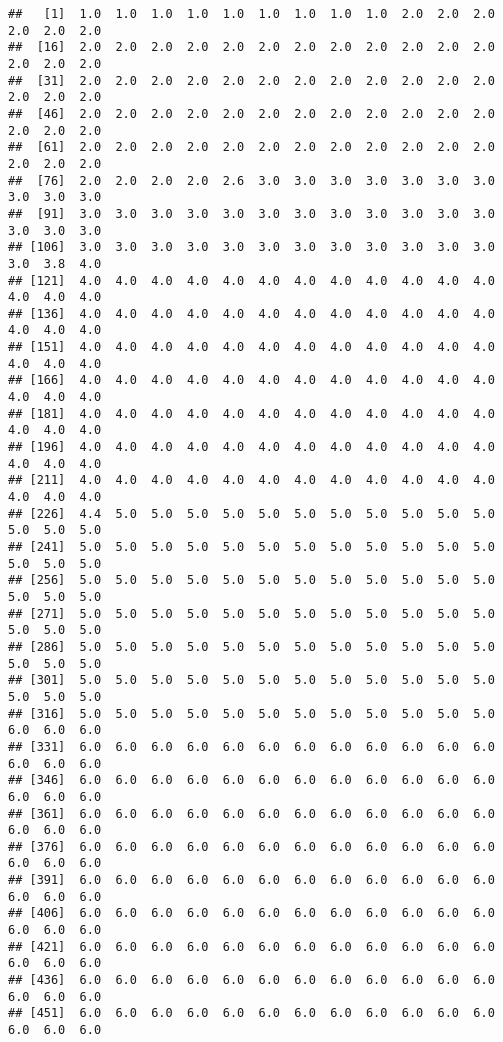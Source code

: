 \documentclass[
]{article}
\begin{document}
\begin{verbatim}
##   [1]  1.0  1.0  1.0  1.0  1.0  1.0  1.0  1.0  1.0  2.0  2.0  2.0  2.0  2.0  2.0
##  [16]  2.0  2.0  2.0  2.0  2.0  2.0  2.0  2.0  2.0  2.0  2.0  2.0  2.0  2.0  2.0
##  [31]  2.0  2.0  2.0  2.0  2.0  2.0  2.0  2.0  2.0  2.0  2.0  2.0  2.0  2.0  2.0
##  [46]  2.0  2.0  2.0  2.0  2.0  2.0  2.0  2.0  2.0  2.0  2.0  2.0  2.0  2.0  2.0
##  [61]  2.0  2.0  2.0  2.0  2.0  2.0  2.0  2.0  2.0  2.0  2.0  2.0  2.0  2.0  2.0
##  [76]  2.0  2.0  2.0  2.0  2.6  3.0  3.0  3.0  3.0  3.0  3.0  3.0  3.0  3.0  3.0
##  [91]  3.0  3.0  3.0  3.0  3.0  3.0  3.0  3.0  3.0  3.0  3.0  3.0  3.0  3.0  3.0
## [106]  3.0  3.0  3.0  3.0  3.0  3.0  3.0  3.0  3.0  3.0  3.0  3.0  3.0  3.8  4.0
## [121]  4.0  4.0  4.0  4.0  4.0  4.0  4.0  4.0  4.0  4.0  4.0  4.0  4.0  4.0  4.0
## [136]  4.0  4.0  4.0  4.0  4.0  4.0  4.0  4.0  4.0  4.0  4.0  4.0  4.0  4.0  4.0
## [151]  4.0  4.0  4.0  4.0  4.0  4.0  4.0  4.0  4.0  4.0  4.0  4.0  4.0  4.0  4.0
## [166]  4.0  4.0  4.0  4.0  4.0  4.0  4.0  4.0  4.0  4.0  4.0  4.0  4.0  4.0  4.0
## [181]  4.0  4.0  4.0  4.0  4.0  4.0  4.0  4.0  4.0  4.0  4.0  4.0  4.0  4.0  4.0
## [196]  4.0  4.0  4.0  4.0  4.0  4.0  4.0  4.0  4.0  4.0  4.0  4.0  4.0  4.0  4.0
## [211]  4.0  4.0  4.0  4.0  4.0  4.0  4.0  4.0  4.0  4.0  4.0  4.0  4.0  4.0  4.0
## [226]  4.4  5.0  5.0  5.0  5.0  5.0  5.0  5.0  5.0  5.0  5.0  5.0  5.0  5.0  5.0
## [241]  5.0  5.0  5.0  5.0  5.0  5.0  5.0  5.0  5.0  5.0  5.0  5.0  5.0  5.0  5.0
## [256]  5.0  5.0  5.0  5.0  5.0  5.0  5.0  5.0  5.0  5.0  5.0  5.0  5.0  5.0  5.0
## [271]  5.0  5.0  5.0  5.0  5.0  5.0  5.0  5.0  5.0  5.0  5.0  5.0  5.0  5.0  5.0
## [286]  5.0  5.0  5.0  5.0  5.0  5.0  5.0  5.0  5.0  5.0  5.0  5.0  5.0  5.0  5.0
## [301]  5.0  5.0  5.0  5.0  5.0  5.0  5.0  5.0  5.0  5.0  5.0  5.0  5.0  5.0  5.0
## [316]  5.0  5.0  5.0  5.0  5.0  5.0  5.0  5.0  5.0  5.0  5.0  5.0  6.0  6.0  6.0
## [331]  6.0  6.0  6.0  6.0  6.0  6.0  6.0  6.0  6.0  6.0  6.0  6.0  6.0  6.0  6.0
## [346]  6.0  6.0  6.0  6.0  6.0  6.0  6.0  6.0  6.0  6.0  6.0  6.0  6.0  6.0  6.0
## [361]  6.0  6.0  6.0  6.0  6.0  6.0  6.0  6.0  6.0  6.0  6.0  6.0  6.0  6.0  6.0
## [376]  6.0  6.0  6.0  6.0  6.0  6.0  6.0  6.0  6.0  6.0  6.0  6.0  6.0  6.0  6.0
## [391]  6.0  6.0  6.0  6.0  6.0  6.0  6.0  6.0  6.0  6.0  6.0  6.0  6.0  6.0  6.0
## [406]  6.0  6.0  6.0  6.0  6.0  6.0  6.0  6.0  6.0  6.0  6.0  6.0  6.0  6.0  6.0
## [421]  6.0  6.0  6.0  6.0  6.0  6.0  6.0  6.0  6.0  6.0  6.0  6.0  6.0  6.0  6.0
## [436]  6.0  6.0  6.0  6.0  6.0  6.0  6.0  6.0  6.0  6.0  6.0  6.0  6.0  6.0  6.0
## [451]  6.0  6.0  6.0  6.0  6.0  6.0  6.0  6.0  6.0  6.0  6.0  6.0  6.0  6.0  6.0

\end{verbatim}
\end{document}
